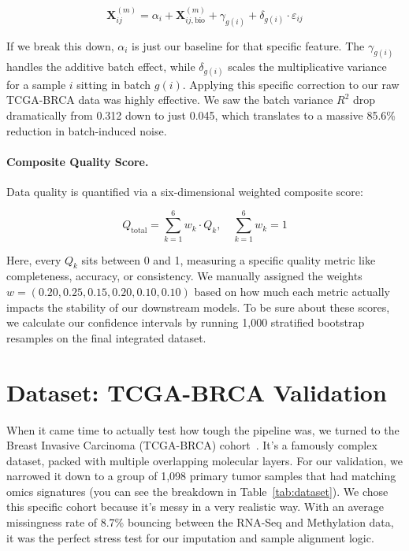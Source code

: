 \documentclass[runningheads]{llncs}
\begin{document}
\begin{equation}
\mathbf{X}^{(m)}_{ij} = \alpha_i + \mathbf{X}^{(m)}_{ij,\text{bio}} + \gamma_{g(i)} + \delta_{g(i)} \cdot \varepsilon_{ij}
\end{equation}

If we break this down, $\alpha_i$ is just our baseline for that specific feature. The $\gamma_{g(i)}$ handles the additive batch effect, while $\delta_{g(i)}$ scales the multiplicative variance for a sample $i$ sitting in batch $g(i)$. Applying this specific correction to our raw TCGA-BRCA data was highly effective. We saw the batch variance $R^2$ drop dramatically from 0.312 down to just 0.045, which translates to a massive 85.6\% reduction in batch-induced noise.

\paragraph{Composite Quality Score.}
Data quality is quantified via a six-dimensional weighted composite score:

\begin{equation}
Q_{\text{total}} = \sum_{k=1}^{6} w_k \cdot Q_k, \quad \sum_{k=1}^{6} w_k = 1
\end{equation}

Here, every $Q_k$ sits between 0 and 1, measuring a specific quality metric like completeness, accuracy, or consistency. We manually assigned the weights $w = (0.20, 0.25, 0.15, 0.20, 0.10, 0.10)$ based on how much each metric actually impacts the stability of our downstream models. To be sure about these scores, we calculate our confidence intervals by running 1,000 stratified bootstrap resamples on the final integrated dataset.

\section{Dataset: TCGA-BRCA Validation}

When it came time to actually test how tough the pipeline was, we turned to the Breast Invasive Carcinoma (TCGA-BRCA) cohort~\cite{weinstein2013}. It's a famously complex dataset, packed with multiple overlapping molecular layers. For our validation, we narrowed it down to a group of 1,098 primary tumor samples that had matching omics signatures (you can see the breakdown in Table~\ref{tab:dataset}). We chose this specific cohort because it's messy in a very realistic way. With an average missingness rate of 8.7\% bouncing between the RNA-Seq and Methylation data, it was the perfect stress test for our imputation and sample alignment logic.
\end{document}

